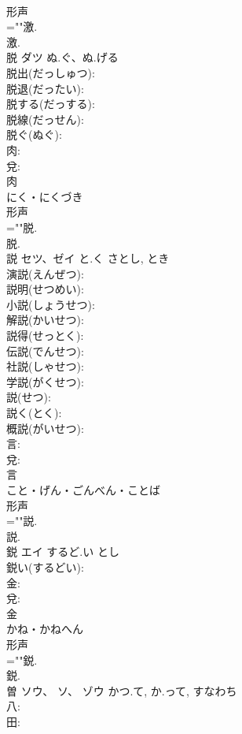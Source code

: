 \documentclass[8pt]{extreport}
\begin{document}
\begin{CJK}{UTF8}{min}
\\	形声 
\\	=""激.
\\	激.
\\	脱	ダツ	ぬ.ぐ、ぬ.げる		
\\	脱出(だっしゅつ): 
\\	脱退(だったい): 
\\	脱する(だっする): 
\\	脱線(だっせん): 
\\	脱ぐ(ぬぐ): 
\\	肉: 
\\	兌: 
\\	肉	
\\	にく・にくづき	
\\	形声 
\\	=""脱.
\\	脱.
\\	説	セツ、ゼイ	と.く	さとし, とき	
\\	演説(えんぜつ): 
\\	説明(せつめい): 
\\	小説(しょうせつ): 
\\	解説(かいせつ): 
\\	説得(せっとく): 
\\	伝説(でんせつ): 
\\	社説(しゃせつ): 
\\	学説(がくせつ): 
\\	説(せつ): 
\\	説く(とく): 
\\	概説(がいせつ): 
\\	言: 
\\	兌: 
\\	言	
\\	こと・げん・ごんべん・ことば	
\\	形声 
\\	=""説.
\\	説.
\\	鋭	エイ	するど.い	とし	
\\	鋭い(するどい): 
\\	金: 
\\	兌: 
\\	金	
\\	かね・かねへん	
\\	形声 
\\	=""鋭.
\\	鋭.
\\	曽	ソウ、 ソ、 ゾウ	かつ.て, か.って, すなわち		
\\	八: 
\\	田: 

\end{CJK}
\end{document}
